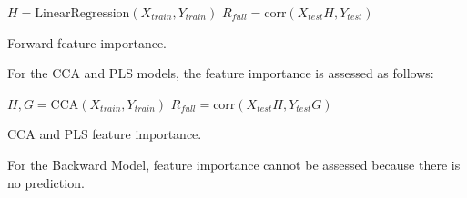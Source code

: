 \begin{algorithm}[H]
      $H = \text{LinearRegression}(X_{train},
Y_{train})$\; $R_{full} = \text{corr}(X_{test} H, Y_{test})$\;

     
\caption{Forward feature importance.} \label{algorithm:fwd_fi} \end{algorithm}


For the CCA and PLS models, the feature importance is assessed as follows:

\begin{algorithm}[H]
      $H, G = \text{CCA}(X_{train},
Y_{train})$\; $R_{full} = \text{corr}(X_{test} H, Y_{test} G)$\;

     
\caption{CCA and PLS feature importance.} \label{algorithm:cdp_fi}
\end{algorithm}

For the Backward Model, feature importance cannot be assessed because there is no prediction.

